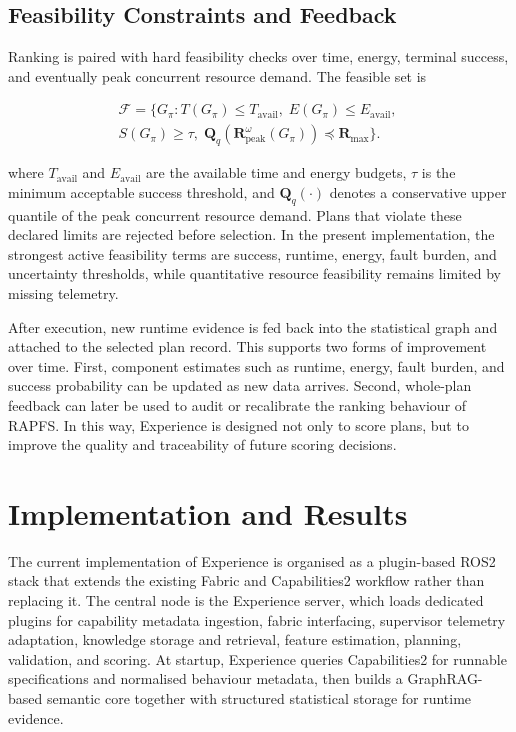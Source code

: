 \documentclass[letterpaper, 10pt, conference]{ieeeconf}
\begin{document}
\subsection{Feasibility Constraints and Feedback}

Ranking is paired with hard feasibility checks over time, energy, terminal success, and eventually peak concurrent resource demand. The feasible set is

\begin{multline}
\mathcal{F}=\{G_{\pi}: T(G_{\pi})\leq T_{\mathrm{avail}},\; E(G_{\pi})\leq E_{\mathrm{avail}},\; \\
S(G_{\pi})\geq \tau,\; \mathbf{Q}_{q}\left(\mathbf{R}_{\mathrm{peak}}^{\omega}(G_{\pi})\right) \preceq \mathbf{R}_{\max}\}.
\end{multline}

where $T_{\mathrm{avail}}$ and $E_{\mathrm{avail}}$ are the available time and energy budgets, $\tau$ is the minimum acceptable success threshold, and $\mathbf{Q}_{q}(\cdot)$ denotes a conservative upper quantile of the peak concurrent resource demand. Plans that violate these declared limits are rejected before selection. In the present implementation, the strongest active feasibility terms are success, runtime, energy, fault burden, and uncertainty thresholds, while quantitative resource feasibility remains limited by missing telemetry.

After execution, new runtime evidence is fed back into the statistical graph and attached to the selected plan record. This supports two forms of improvement over time. First, component estimates such as runtime, energy, fault burden, and success probability can be updated as new data arrives. Second, whole-plan feedback can later be used to audit or recalibrate the ranking behaviour of RAPFS. In this way, Experience is designed not only to score plans, but to improve the quality and traceability of future scoring decisions.

\section{Implementation and Results}

The current implementation of Experience is organised as a plugin-based ROS2 stack that extends the existing Fabric and Capabilities2 workflow rather than replacing it. The central node is the Experience server, which loads dedicated plugins for capability metadata ingestion, fabric interfacing, supervisor telemetry adaptation, knowledge storage and retrieval, feature estimation, planning, validation, and scoring. At startup, Experience queries Capabilities2 for runnable specifications and normalised behaviour metadata, then builds a GraphRAG-based semantic core together with structured statistical storage for runtime evidence.
\end{document}
